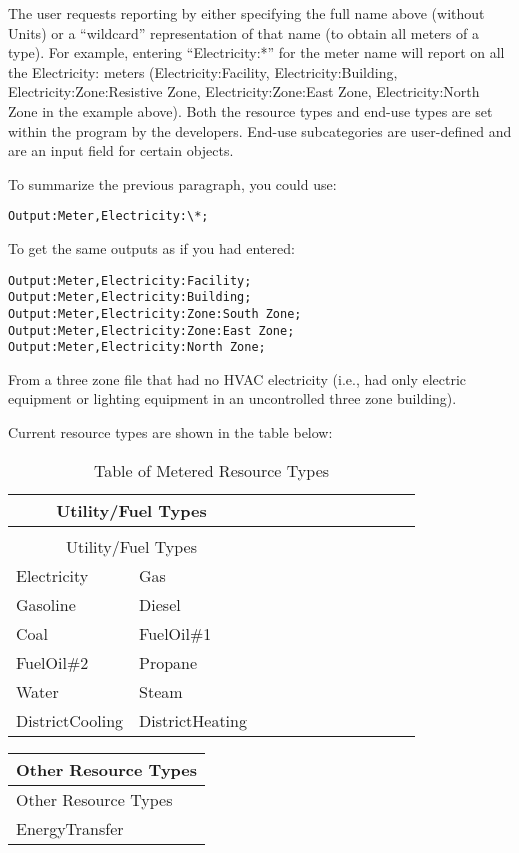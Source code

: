 The user requests reporting by either specifying the full name above (without Units) or a “wildcard” representation of that name (to obtain all meters of a type). For example, entering “Electricity:*” for the meter name will report on all the Electricity: meters (Electricity:Facility, Electricity:Building, Electricity:Zone:Resistive Zone, Electricity:Zone:East Zone, Electricity:North Zone in the example above). Both the resource types and end-use types are set within the program by the developers. End-use subcategories are user-defined and are an input field for certain objects.

To summarize the previous paragraph, you could use:

\begin{lstlisting}
Output:Meter,Electricity:\*;
\end{lstlisting}

To get the same outputs as if you had entered:

\begin{lstlisting}
Output:Meter,Electricity:Facility;
Output:Meter,Electricity:Building;
Output:Meter,Electricity:Zone:South Zone;
Output:Meter,Electricity:Zone:East Zone;
Output:Meter,Electricity:North Zone;
\end{lstlisting}

From a three zone file that had no HVAC electricity (i.e., had only electric equipment or lighting equipment in an uncontrolled three zone building).

Current resource types are shown in the table below:

\begin{longtable}[c]{p{0.5in}p{0.5in}p{0.5in}p{0.5in}p{0.5in}p{0.5in}p{0.5in}p{0.5in}p{0.5in}p{0.5in}p{0.5in}p{0.5in}}
\caption{Table of Metered Resource Types \label{table:table-of-metered-resource-types}} \tabularnewline
\toprule 
\multicolumn{2}{c}{Utility/Fuel Types} \tabularnewline
\midrule
\endfirsthead

\caption[]{Table of Metered Resource Types} \tabularnewline
\toprule 
\multicolumn{2}{c}{Utility/Fuel Types} \tabularnewline
\midrule
\endhead

Electricity & Gas \tabularnewline
Gasoline & Diesel \tabularnewline
Coal & FuelOil\#1 \tabularnewline
FuelOil\#2 & Propane \tabularnewline
Water & Steam \tabularnewline
DistrictCooling & DistrictHeating \tabularnewline
\bottomrule
\end{longtable}

\begin{longtable}[c]{@{}l@{}}
\toprule 
Other Resource Types \tabularnewline
\midrule
\endfirsthead

\toprule 
Other Resource Types \tabularnewline
\midrule
\endhead

EnergyTransfer \tabularnewline
\bottomrule
\end{longtable}

